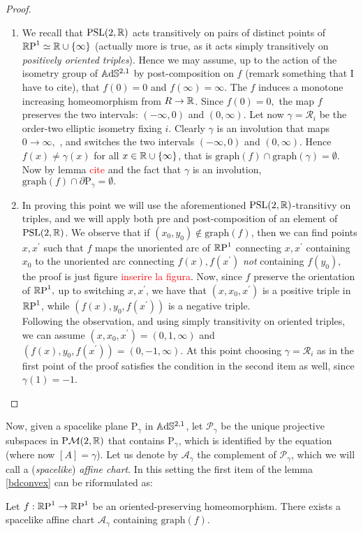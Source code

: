 \begin{proof}
    \begin{enumerate}
        \item We recall that $\PSL$ acts transitively on pairs of distinct points of $\R\text{P}^1\simeq\R\cup\{\infty\}$ (actually more is true, as it acts simply transitively on \textit{positively oriented triples}). Hence we may assume, up to the action of the isometry group of $\A^{2,1}$ by post-composition on $f$ (remark something that I have to cite), that $f(0)=0$ and $f(\infty)=\infty.$ The $f$ induces a monotone increasing homeomorphism from $R\to\R$. Since $f(0)=0,$ the map $f$ preserves the two intervals: $(-\infty,0)$ and $(0,\infty).$ Let now $\gamma=\mathcal{R}_i$ be the order-two elliptic isometry fixing $i$. Clearly $\gamma$ is an involution that maps $0\to\infty,$ , and switches the two intervals $(-\infty,0)$ and $(0,\infty)$. Hence $f(x)\neq\gamma(x)$ for all $x\in\R\cup\{\infty\}$, that is $\text{graph}(f)\cap\text{graph}(\gamma)=\emptyset.$ Now by lemma \textcolor{red}{cite} and the fact that $\gamma$ is an involution, $\text{graph}(f)\cap\partial\text{P}_\gamma=\emptyset.$
        \item In proving this point we will use the aforementioned $\PSL$-transitivy on triples, and we will apply both pre and post-composition of an element of $\PSL$. We observe that if $(x_0,y_0)\notin\text{graph}(f)$, then we can find points $x,x^{\prime}$ such that $f$ maps the unoriented arc of $\R\text{P}^1$ connecting $x,x^{\prime}$ containing $x_0$ to the unoriented arc connecting $f(x),f(x^{\prime})$ \textit{not} containing $f(y_0),$ the proof is just figure \textcolor{red}{inserire la figura}. Now, since $f$ preserve the orientation of $\R\text{P}^1,$ up to switching $x,x^{\prime}$, we have that $(x, x_0, x^{\prime})$ is a positive triple in $\S$, while $(f(x),y_0,f(x^{\prime}))$ is a negative triple. \\
        Following the observation, and using simply transitivity on oriented triples, we can assume $(x,x_0,x^{\prime})=(0,1,\infty)$ and $(f(x),y_0,f(x^{\prime}))=(0,-1,\infty).$ At this point choosing $\gamma=\mathcal{R}_i$ as in the first point of the proof satisfies the condition in the second item as well, since $\gamma(1)=-1$.  
    \end{enumerate}
\end{proof}

Now, given a spacelike plane $\text{P}_\gamma$ in $\A^{2,1}$, let $\mathcal{P}_\gamma$ be the unique projective subspaces in $\text{P}\mathcal{M}(2,\R)$ that contains $\text{P}_\gamma$, which is identified by the equation  (where now $[A]=\gamma$). Let us denote by $\mathcal{A}_\gamma$ the complement of $\mathcal{P}_\gamma$, which we will call a (\textit{spacelike}) \textit{affine chart}. In this setting the first item of the lemma \ref{bdconvex} can be riformulated as: 
\begin{corollary}
    Let $f:\S\to\S$ be an oriented-preserving homeomorphism. There exists a spacelike affine chart $\mathcal{A}_\gamma$ containing $\text{graph}(f)$.
\end{corollary} 

